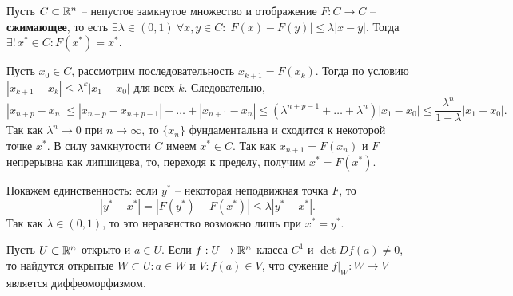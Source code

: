 \begin{theorem}
	Пусть $C \subset \mathbb{R}^n$ -- непустое замкнутое множество и отображение $F : C \to C$ -- \textbf{сжимающее}, то есть
	$\exists \lambda \in (0, 1) \ \forall x, y \in C : |F(x) - F(y)| \leq \lambda |x - y|$. 
	Тогда $\exists! \, x^* \in C : F(x^*) = x^*$.
\end{theorem}

\begin{myproof}
	Пусть $x_0 \in C$, рассмотрим последовательность $x_{k+1} = F(x_k)$. 
	Тогда по условию $|x_{k+1} - x_k| \leq \lambda^k |x_1 - x_0|$ для всех $k$. 
	Следовательно, 
	\[ |x_{n+p} - x_n| \leq |x_{n+p} - x_{n+p-1}| + \dotsc + |x_{n+1} - x_n| \leq (\lambda^{n+p-1} + \dotsc + \lambda^{n}) |x_1 - x_0| \leq \frac{\lambda^n}{1-\lambda} |x_1 - x_0|. \]
	Так как $\lambda^n \to 0$ при $n \to \infty$, то $\{x_n\}$ фундаментальна и сходится к некоторой точке $x^*$.
	В силу замкнутости $C$ имеем $x^* \in C$. 
	Так как $x_{n+1} = F(x_n)$ и $F$ непрерывна как липшицева, то, переходя к пределу, получим $x^* = F(x^*)$.

	\vspace{5pt}
	Покажем единственность: если $y^*$ -- некоторая неподвижная точка $F$, то 
	\[ |y^* - x^*| = |F(y^*) - F(x^*)| \leq \lambda |y^* - x^*|. \]
	Так как $\lambda \in (0, 1)$, то это неравенство возможно лишь при $x^* = y^*$.
\end{myproof}

\begin{theorem}
	Пусть $U \subset \mathbb{R}^n$ открыто и $a \in U$. 
	Если $f : U \to \mathbb{R}^n$ класса $C^1$ и $\det Df(a) \neq 0$, то 
	найдутся открытые $W \subset U : a \in W$ и $V : f(a) \in V$, что сужение 
	$f|_W : W \to V$ является диффеоморфизмом.
\end{theorem}

